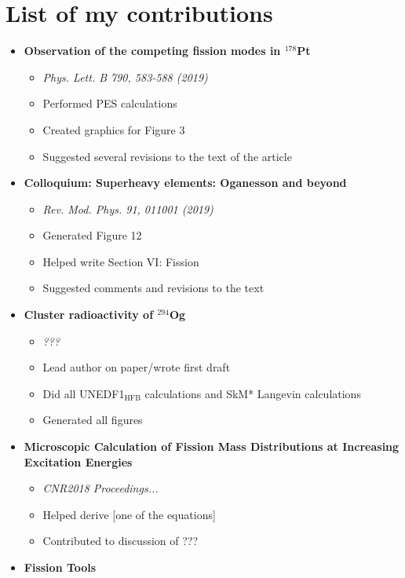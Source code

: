 \chapter{List of my contributions}\label{append:Contributions}

\begin{itemize}
	\item \textbf{Observation of the competing fission modes in $^{178}$Pt}
	\begin{itemize}
		\item \textit{Phys. Lett. B 790, 583-588 (2019)}
		\item Performed PES calculations
		\item Created graphics for Figure 3
		\item Suggested several revisions to the text of the article
	\end{itemize}
	\item \textbf{Colloquium: Superheavy elements: Oganesson and beyond}
	\begin{itemize}
		\item \textit{Rev. Mod. Phys. 91, 011001 (2019)}
		\item Generated Figure 12
		\item Helped write Section VI: Fission
		\item Suggested comments and revisions to the text
	\end{itemize}
	\item \textbf{Cluster radioactivity of $^{294}$Og}
	\begin{itemize}
		\item \textit{???}
		\item Lead author on paper/wrote first draft
		\item Did all UNEDF1$_{\mathrm{HFB}}$ calculations and SkM* Langevin calculations
		\item Generated all figures
	\end{itemize}
	\item \textbf{Microscopic Calculation of Fission Mass Distributions at Increasing Excitation Energies}
	\begin{itemize}
		\item \textit{CNR2018 Proceedings...}
		\item Helped derive [one of the equations]
		\item Contributed to discussion of ???
	\end{itemize}
	\item \textbf{Fission Tools}
	\begin{itemize}

\end{itemize}
\end{itemize}
